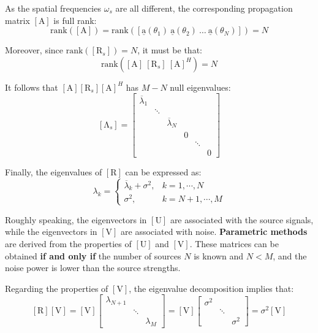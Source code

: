 As the spatial frequencies $\omega_{s}$ are all different, the corresponding propagation matrix $\left[\mathrm{A}\right]$ is full rank:
\[
\mathrm{rank}\left( \left[\mathrm{A}\right] \right) = \mathrm{rank}\left( \left[ \underline{\mathrm{a}}(\theta_{1}) \ \underline{\mathrm{a}}(\theta_{2}) \ \dots \ \underline{\mathrm{a}}(\theta_{N}) \right] \right) = N
\]

Moreover, since $\mathrm{rank}\left( \left[\mathrm{R}_{s}\right] \right) = N$, it must be that:
\[
\mathrm{rank}\left( \left[\mathrm{A}\right] \ \left[\mathrm{R}_{s}\right] \ \left[\mathrm{A}\right]^{H} \right) = N
\]

It follows that $\left[\mathrm{A}\right] \left[\mathrm{R}_{s}\right] \left[\mathrm{A}\right]^{H}$ has $M - N$ null eigenvalues:
\[
\left[\mathrm{\Lambda}_{s}\right] =
\begin{bmatrix}
\overline{\lambda}_{1} & & & \\
& \ddots & & \\
& & \overline{\lambda}_{N} & \\
& & & 0 \\
& & & & \ddots \\
& & & & & 0
\end{bmatrix}
\]

Finally, the eigenvalues of $\left[\mathrm{R}\right]$ can be expressed as:
\[
\lambda_{k} =
\left\{
\begin{array}{lc}
\overline{\lambda}_{k} + \sigma^{2}, & k = 1, \cdots, N  \\
\sigma^{2}, & k = N+1, \cdots, M
\end{array}
\right.
\]

Roughly speaking, the eigenvectors in $\left[\mathrm{U}\right]$ are associated with the source signals, while the eigenvectors in $\left[\mathrm{V}\right]$ are associated with noise.
\textbf{Parametric methods} are derived from the properties of $\left[\mathrm{U}\right]$ and $\left[\mathrm{V}\right]$.
These matrices can be obtained \textbf{if and only if} the number of sources $N$ is known and $N < M$, and the noise power is lower than the source strengths.

Regarding the properties of $\left[\mathrm{V}\right]$, the eigenvalue decomposition implies that:
\[
\left[\mathrm{R}\right] \left[\mathrm{V}\right] =
\left[\mathrm{V}\right]
\begin{bmatrix}
\lambda_{N+1} & & \\
& \ddots & \\
& & \lambda_{M}
\end{bmatrix}
=
\left[\mathrm{V}\right]
\begin{bmatrix}
\sigma^{2} & & \\
& \ddots & \\
& & \sigma^{2}
\end{bmatrix}
= \sigma^{2}\left[\mathrm{V}\right]
\]


